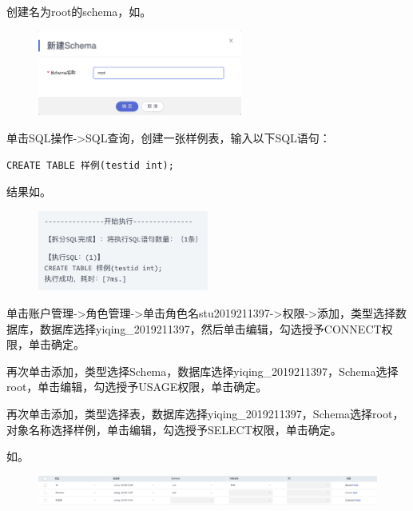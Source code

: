 \documentclass[lang=cn,11pt,a4paper,cite=authornum]{paper}
\begin{document}
创建名为root的schema，如。
\begin{figure}[!htb]
    \centering
    \includegraphics[width=0.6\textwidth]{./images/res7.png}
    \caption{\label{fig:res7}}
\end{figure}

单击SQL操作->SQL查询，创建一张样例表，输入以下SQL语句：
\begin{code}
\begin{verbatim}
CREATE TABLE 样例(testid int);
\end{verbatim}
\end{code}

结果如。
\begin{figure}[!htb]
    \centering
    \includegraphics[width=0.5\textwidth]{./images/res8.png}
    \caption{\label{fig:res8}}
\end{figure}

单击账户管理->角色管理->单击角色名stu2019211397->权限->添加，类型选择数据库，数据库选择yiqing\_2019211397，然后单击编辑，勾选授予CONNECT权限，单击确定。

再次单击添加，类型选择Schema，数据库选择yiqing\_2019211397，Schema选择root，单击编辑，勾选授予USAGE权限，单击确定。

再次单击添加，类型选择表，数据库选择yiqing\_2019211397，Schema选择root，对象名称选择样例，单击编辑，勾选授予SELECT权限，单击确定。

如。
\begin{figure}[!htb]
    \centering
    \includegraphics[width=\textwidth]{./images/res9.png}
    \caption{\label{fig:res9}}
\end{figure}
\end{document}
